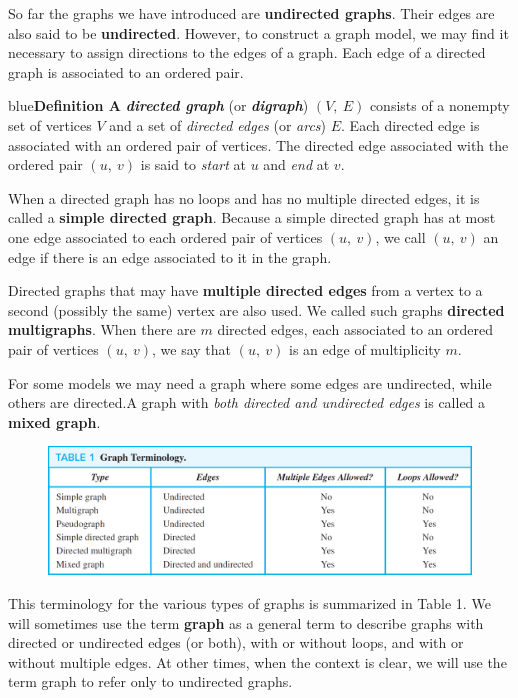 \documentclass[11pt]{article}
\newenvironment{definition}[1]{\begin{mybox}{blue}{\textbf{Definition #1}}}{\end{mybox}}
\begin{document}
So far the graphs we have introduced are \textbf{undirected graphs}. Their edges are also said to be \textbf{undirected}. However, to construct a graph model, we may find it necessary to assign directions to the edges of a graph. Each edge of a directed graph is associated to an ordered pair. 

\begin{definition}{2}
A \textit{\textbf{directed graph}} (or \textit{\textbf{digraph}}) $(V,\ E)$ consists of a nonempty set of vertices $V$ and a set of \textit{directed edges} (or \textit{arcs}) $E$. Each directed edge is associated with an ordered pair of vertices. The directed edge associated with the ordered pair $(u,\ v)$ is said to \textit{start} at $u$ and \textit{end} at $v$.
\end{definition}

When a directed graph has no loops and has no multiple directed edges, it is called a \textbf{simple directed graph}. Because a simple directed graph has at most one edge associated to each ordered pair of vertices $(u,\ v)$, we call $(u,\ v)$ an edge if there is an edge associated to it in the graph.

Directed graphs that may have \textbf{multiple directed edges} from a vertex to a second (possibly the same) vertex are also used. We called such graphs \textbf{directed multigraphs}. When there are $m$ directed edges, each associated to an ordered pair of vertices $(u,\ v)$, we say that $(u,\ v)$ is an edge of multiplicity $m$.

For some models we may need a graph where some edges are undirected, while others are directed.A graph with \textit{both directed and undirected edges} is called a \textbf{mixed graph}. 

\begin{figure}[h!]
    \centering
    \includegraphics[width=\textwidth]{img/ch10-table1.png}
    \label{fig:my_label}
\end{figure}

This terminology for the various types of graphs is summarized in Table 1. We will sometimes use the term \textbf{graph} as a general term to describe graphs with directed or undirected edges (or both), with or without loops, and with or without multiple edges. At other times, when the context is clear, we will use the term graph to refer only to undirected graphs.
\end{document}

